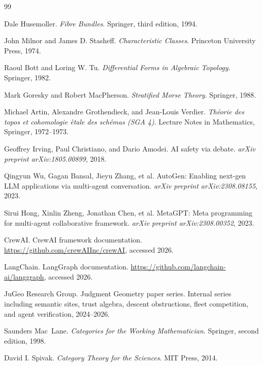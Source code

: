 \documentclass[11pt]{article}
\begin{document}
\begin{thebibliography}{99}

Dale Husemoller.
\newblock \emph{Fibre Bundles}.
\newblock Springer, third edition, 1994.

John Milnor and James D. Stasheff.
\newblock \emph{Characteristic Classes}.
\newblock Princeton University Press, 1974.

Raoul Bott and Loring W. Tu.
\newblock \emph{Differential Forms in Algebraic Topology}.
\newblock Springer, 1982.

Mark Goresky and Robert MacPherson.
\newblock \emph{Stratified Morse Theory}.
\newblock Springer, 1988.

Michael Artin, Alexandre Grothendieck, and Jean-Louis Verdier.
\newblock \emph{Th\'eorie des topos et cohomologie \`etale des sch\'emas (SGA 4)}.
\newblock Lecture Notes in Mathematics, Springer, 1972--1973.

Geoffrey Irving, Paul Christiano, and Dario Amodei.
\newblock AI safety via debate.
\newblock \emph{arXiv preprint arXiv:1805.00899}, 2018.

Qingyun Wu, Gagan Bansal, Jieyu Zhang, et al.
\newblock AutoGen: Enabling next-gen LLM applications via multi-agent conversation.
\newblock \emph{arXiv preprint arXiv:2308.08155}, 2023.

Sirui Hong, Xinlin Zheng, Jonathan Chen, et al.
\newblock MetaGPT: Meta programming for multi-agent collaborative framework.
\newblock \emph{arXiv preprint arXiv:2308.00352}, 2023.

CrewAI.
\newblock CrewAI framework documentation.
\newblock \url{https://github.com/crewAIInc/crewAI}, accessed 2026.

LangChain.
\newblock LangGraph documentation.
\newblock \url{https://github.com/langchain-ai/langgraph}, accessed 2026.

JuGeo Research Group.
\newblock Judgment Geometry paper series.
\newblock Internal series including semantic sites, trust algebra, descent
obstructions, fleet competition, and agent verification, 2024--2026.

Saunders Mac~Lane.
\newblock \emph{Categories for the Working Mathematician}.
\newblock Springer, second edition, 1998.

David I. Spivak.
\newblock \emph{Category Theory for the Sciences}.
\newblock MIT Press, 2014.

\end{thebibliography}
\end{document}
